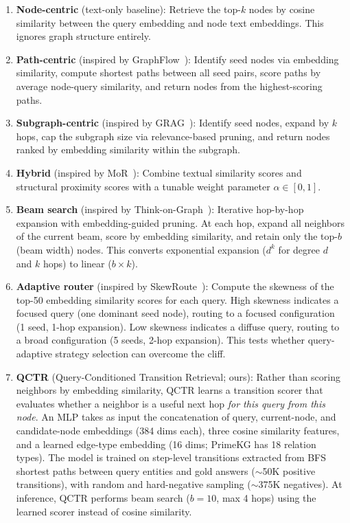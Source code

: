 \documentclass[11pt]{article}
\begin{document}
\begin{enumerate}
    \item \textbf{Node-centric} (text-only baseline): Retrieve the top-$k$ nodes by cosine similarity between the query embedding and node text embeddings. This ignores graph structure entirely.

    \item \textbf{Path-centric} (inspired by GraphFlow~\citep{yu2025graphflow}): Identify seed nodes via embedding similarity, compute shortest paths between all seed pairs, score paths by average node-query similarity, and return nodes from the highest-scoring paths.

    \item \textbf{Subgraph-centric} (inspired by GRAG~\citep{hu2024grag}): Identify seed nodes, expand by $k$ hops, cap the subgraph size via relevance-based pruning, and return nodes ranked by embedding similarity within the subgraph.

    \item \textbf{Hybrid} (inspired by MoR~\citep{yue2025mor}): Combine textual similarity scores and structural proximity scores with a tunable weight parameter $\alpha \in [0, 1]$.

    \item \textbf{Beam search} (inspired by Think-on-Graph~\citep{sun2024tog}): Iterative hop-by-hop expansion with embedding-guided pruning. At each hop, expand all neighbors of the current beam, score by embedding similarity, and retain only the top-$b$ (beam width) nodes. This converts exponential expansion ($d^k$ for degree $d$ and $k$ hops) to linear ($b \times k$).

    \item \textbf{Adaptive router} (inspired by SkewRoute~\citep{wang2025skewroute}): Compute the skewness of the top-50 embedding similarity scores for each query. High skewness indicates a focused query (one dominant seed node), routing to a focused configuration (1 seed, 1-hop expansion). Low skewness indicates a diffuse query, routing to a broad configuration (5 seeds, 2-hop expansion). This tests whether query-adaptive strategy selection can overcome the cliff.

    \item \textbf{QCTR} (Query-Conditioned Transition Retrieval; ours): Rather than scoring neighbors by embedding similarity, QCTR learns a transition scorer that evaluates whether a neighbor is a useful next hop \textit{for this query from this node}. An MLP takes as input the concatenation of query, current-node, and candidate-node embeddings (384 dims each), three cosine similarity features, and a learned edge-type embedding (16 dims; PrimeKG has 18 relation types). The model is trained on step-level transitions extracted from BFS shortest paths between query entities and gold answers ($\sim$50K positive transitions), with random and hard-negative sampling ($\sim$375K negatives). At inference, QCTR performs beam search ($b = 10$, max 4 hops) using the learned scorer instead of cosine similarity.
\end{enumerate}
\end{document}
